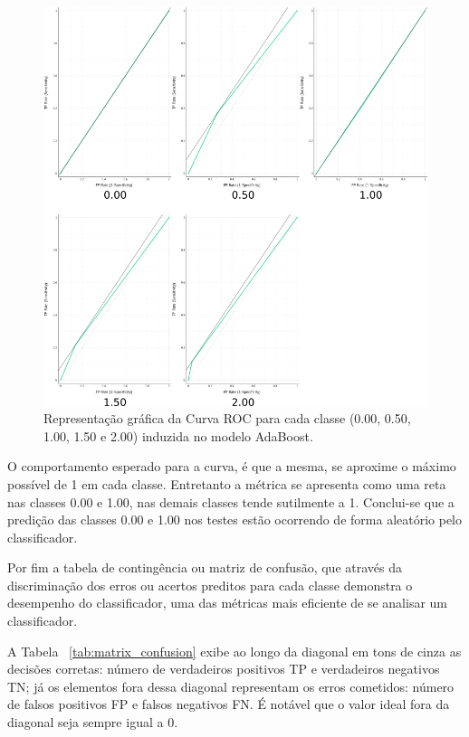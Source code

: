 \begin{figure}[H]
\begin{center}
    \includegraphics[scale=0.75]{figuras/roc.png}
\end{center}
\caption{Representação gráfica da Curva ROC para cada classe (0.00, 0.50, 1.00, 1.50 e 2.00) induzida no modelo AdaBoost.}
\label{fig:roc}
\end{figure}

O comportamento esperado para a curva, é que a mesma, se aproxime o máximo possível de 1 em cada classe. Entretanto a métrica se apresenta como uma reta nas classes 0.00 e 1.00, nas demais classes tende sutilmente a 1. Conclui-se que a predição das classes 0.00 e 1.00 nos testes estão ocorrendo de forma aleatório pelo classificador.

Por fim a tabela de contingência ou matriz de confusão, que através da discriminação dos erros ou acertos preditos para cada classe demonstra o desempenho do classificador, uma das métricas mais eficiente de se analisar um classificador. 

A Tabela ~\ref{tab:matrix_confusion} exibe ao longo da diagonal em tons de cinza as decisões corretas: número de verdadeiros positivos TP e verdadeiros negativos TN; já os elementos fora dessa diagonal representam os erros cometidos: número de falsos positivos FP e falsos negativos FN. É notável que o valor ideal fora da diagonal seja sempre igual a 0.  

